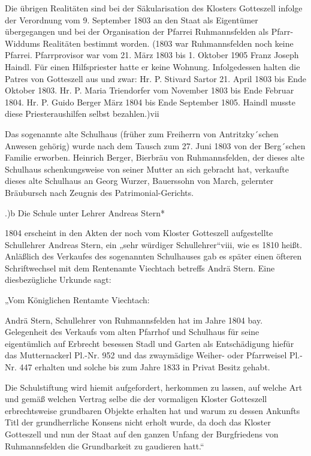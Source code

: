 \documentclass{book}
\begin{document}
Die übrigen Realitäten sind bei der Säkularisation des Klosters Gotteszell
infolge der Verordnung vom 9. September 1803 an den Staat als Eigentümer
übergegangen und bei der Organisation der Pfarrei Ruhmannsfelden als
Pfarr-Widdums Realitäten bestimmt worden. (1803 war Ruhmannsfelden noch keine
Pfarrei. Pfarrprovisor war vom 21. März 1803 bis 1. Oktober 1905 Franz Joseph
Haindl. Für einen Hilfspriester hatte er keine Wohnung. Infolgedessen halten die
Patres von Gotteszell aus und zwar: Hr. P. Stivard Sartor 21. April 1803 bis
Ende Oktober 1803. Hr. P. Maria Triendorfer vom November 1803 bis Ende Februar
1804. Hr. P. Guido Berger März 1804 bis Ende September 1805. Haindl musste diese
Priesteraushilfen selbst bezahlen.)vii

Das sogenannte alte Schulhaus (früher zum Freiherrn von Antritzky´schen Anwesen
gehörig) wurde nach dem Tausch zum 27. Juni 1803 von der Berg´schen Familie
erworben. Heinrich Berger, Bierbräu von Ruhmannsfelden, der dieses alte
Schulhaus schenkungsweise von seiner Mutter an sich gebracht hat, verkaufte
dieses alte Schulhaus an Georg Wurzer, Bauerssohn von March, gelernter
Bräubursch nach Zeugnis des Patrimonial-Gerichts.

.)b Die Schule unter Lehrer Andreas Stern*

1804 erscheint in den Akten der noch vom Kloster Gotteszell aufgestellte
Schullehrer Andreas Stern, ein „sehr würdiger Schullehrer“viii, wie es 1810
heißt. Anläßlich des Verkaufes des sogenannten Schulhauses gab es später einen
öfteren Schriftwechsel mit dem Rentenamte Viechtach betreffs Andrä Stern. Eine
diesbezügliche Urkunde sagt:

„Vom Königlichen Rentamte Viechtach:

Andrä Stern, Schullehrer von Ruhmannsfelden hat im Jahre 1804 bay. Gelegenheit
des Verkaufs vom alten Pfarrhof und Schulhaus für seine eigentümlich auf
Erbrecht besessen Stadl und Garten als Entschädigung hiefür das Mutternackerl
Pl.-Nr. 952 und das zwaymädige Weiher- oder Pfarrweisel Pl.-Nr. 447 erhalten und
solche bis zum Jahre 1833 in Privat Besitz gehabt.

Die Schulstiftung wird hiemit aufgefordert, herkommen zu lassen, auf welche Art
und gemäß welchen Vertrag selbe die der vormaligen Kloster Gotteszell
erbrechtsweise grundbaren Objekte erhalten hat und warum zu dessen Ankunfts Titl
der grundherrliche Konsens nicht erholt wurde, da doch das Kloster Gotteszell
und nun der Staat auf den ganzen Unfang der Burgfriedens von Ruhmannsfelden die
Grundbarkeit zu gaudieren hatt.“
\end{document}

